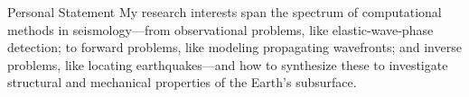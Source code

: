 \begin{rSection}{Personal Statement}
    My research interests span the spectrum of computational methods in seismology---from observational problems, like elastic-wave-phase detection; to forward problems, like modeling propagating wavefronts; and inverse problems, like locating earthquakes---and how to synthesize these to investigate structural and mechanical properties of the Earth's subsurface.
\end{rSection}